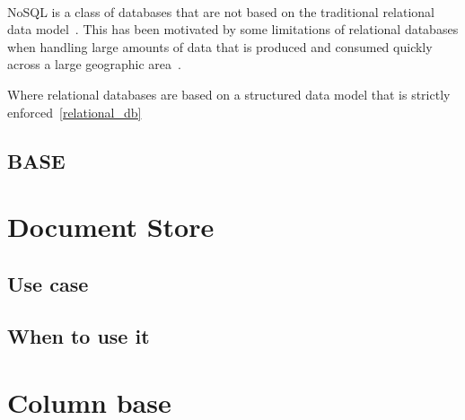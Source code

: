 \documentclass{CRPITStyle}
\renewcommand{\cite}{\citep}
\begin{document}
\paragraph{} NoSQL is a class of databases that are not based on the
traditional relational data model~\cite{nosql_db}.
This has been motivated by some limitations of relational databases
when handling large amounts of data that is produced and consumed
quickly across a large geographic area~\cite{nosql_db}.

Where relational databases are based on a structured
data model that is strictly enforced~\ref{relational_db}



\subsection{BASE}




\section{Document Store}


\subsection{Use case}

\subsection{When to use it}


\section{Column base}
\end{document}
